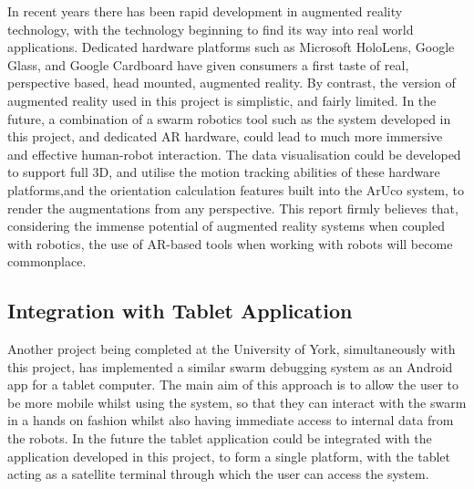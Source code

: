 In recent years there has been rapid development in augmented reality technology, with the technology beginning to find its way into real world applications. Dedicated hardware platforms such as Microsoft HoloLens, Google Glass, and Google Cardboard have given consumers a first taste of real, perspective based, head mounted, augmented reality. By contrast, the version of augmented reality used in this project is simplistic, and fairly limited. In the future, a combination of a swarm robotics tool such as the system developed in this project, and dedicated AR hardware, could lead to much more immersive and effective human-robot interaction. The data visualisation could be developed to support full 3D, and utilise the motion tracking abilities of these hardware platforms,and the orientation calculation features built into the ArUco system, to render the augmentations from any perspective. This report firmly believes that, considering the immense potential of augmented reality systems when coupled with robotics, the use of AR-based tools when working with robots will become commonplace.


\subsection{Integration with Tablet Application}

Another project being completed at the University of York, simultaneously with this project, has implemented a similar swarm debugging system as an Android app for a tablet computer. The main aim of this approach is to allow the user to be more mobile whilst using the system, so that they can interact with the swarm in a hands on fashion whilst also having immediate access to internal data from the robots. In the future the tablet application could be integrated with the application developed in this project, to form a single platform, with the tablet acting as a satellite terminal through which the user can access the system.

